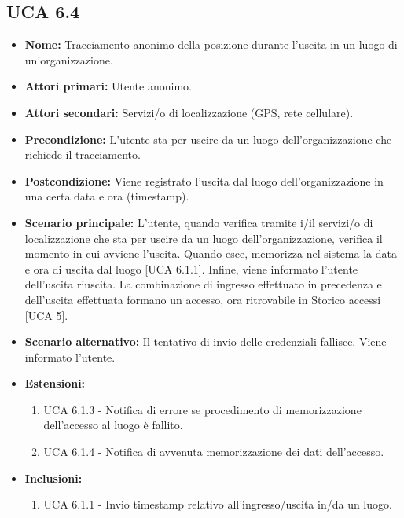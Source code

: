 \subsection{UCA 6.4} %
\begin{itemize}
	\item \textbf{Nome:} Tracciamento anonimo della posizione durante l'uscita in un luogo di un'organizzazione.
	\item \textbf{Attori primari:} Utente anonimo.
	\item \textbf{Attori secondari:} Servizi/o di localizzazione (GPS, rete cellulare).
	\item \textbf{Precondizione:} L'utente sta per uscire da un luogo dell'organizzazione che richiede il tracciamento.
	\item \textbf{Postcondizione:} Viene registrato l'uscita dal luogo dell'organizzazione in una certa data e ora (timestamp).
	\item \textbf{Scenario principale:} L'utente, quando verifica tramite i/il servizi/o di localizzazione che sta per uscire da un luogo dell'organizzazione, verifica il momento in cui avviene l'uscita.
	Quando esce, memorizza nel sistema la data e ora di uscita dal luogo [UCA 6.1.1].
	Infine, viene informato l'utente dell'uscita riuscita. La combinazione di ingresso effettuato in precedenza e dell'uscita effettuata formano un accesso, ora ritrovabile in Storico accessi [UCA 5].
	\item \textbf{Scenario alternativo:} Il tentativo di invio delle credenziali fallisce. Viene informato l'utente.
	\item \textbf{Estensioni:}
	\begin{enumerate}
		\item UCA 6.1.3 - Notifica di errore se procedimento di memorizzazione dell'accesso al luogo è fallito.
		\item UCA 6.1.4 - Notifica di avvenuta memorizzazione dei dati dell'accesso.
	\end{enumerate}
	\item \textbf{Inclusioni:}
	\begin{enumerate}
		\item UCA 6.1.1 - Invio timestamp relativo all'ingresso/uscita in/da un luogo.
	\end{enumerate}
\end{itemize}
